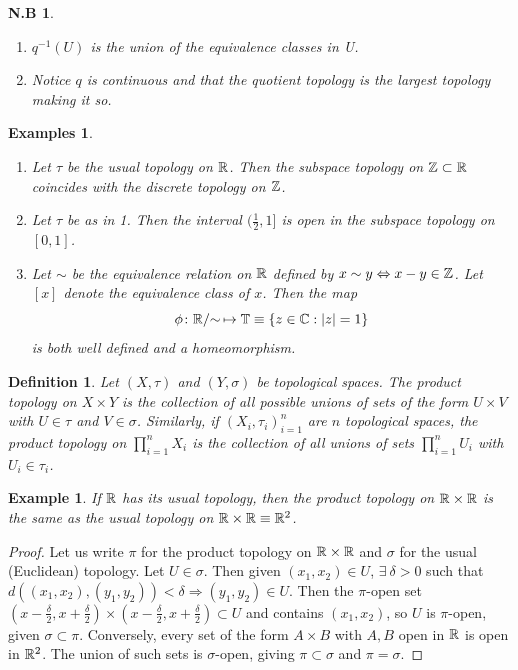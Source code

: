 \documentclass{notes}
\theoremstyle{plain}
\newtheorem{definition}[proposition]{Definition}
\newtheorem*{example}{Example}
\newtheorem*{examples}{Examples}
\newtheorem*{notes}{N.B}
\newcommand{\T}{\mathbb{T}}
\newcommand{\quot}[1]{#1/\negthickspace\sim\,}
\begin{document}
\begin{notes}
\begin{enumerate}
\item $q^{-1}(U)$ is the union of the equivalence classes in U.
\item Notice $q$ is continuous and that the quotient topology is the
largest topology making it so.
\end{enumerate}
\end{notes}

\begin{examples}
\begin{enumerate}
\item Let $\tau$ be the usual topology on $\mathbb{R}$.  Then the subspace topology
on $\mathbb{Z} \subset \mathbb{R}$ coincides with the discrete topology on $\mathbb{Z}$.
\item Let $\tau$ be as in 1.  Then the interval $(\frac{1}{2},1]$ is open
in the subspace topology on $[0,1]$.
\item Let $\sim$ be the equivalence relation on $\mathbb{R}$ defined by $x \sim y
\Leftrightarrow x-y \in \mathbb{Z}$.  Let $[x]$ denote the equivalence class
of $x$.  Then the map \[
\phi \colon \quot{\R} \mapsto \T \equiv \{ z \in \C : 
\abs{z}=1 \}
\] is both well defined and a homeomorphism.
\end{enumerate}
\end{examples}

\begin{definition}
Let $(X,\tau)$ and $(Y,\sigma)$ be topological spaces. The product topology%
on $X \times Y$ is the collection of all possible unions of sets of the form
$U \times V$ with $U \in \tau$ and $V \in \sigma$.  Similarly, if 
$(X_i,\tau_i)_{i=1}^{n}$ are $n$ topological spaces, the product topology 
on $\prod_{i=1}^n X_i$ is the collection of all unions of sets 
$\prod_{i=1}^n U_i$ with $U_i \in \tau_i$.
\end{definition}

\begin{example}
If $\mathbb{R}$ has its usual topology, then the product topology on $\mathbb{R} \times \mathbb{R}$
is the same as the usual topology on $\mathbb{R} \times \mathbb{R} \equiv \mathbb{R}^2$.
\end{example}

\begin{proof}
Let us write $\pi$ for the product topology on $\mathbb{R} \times \mathbb{R}$ and $\sigma$ for
the usual (Euclidean) topology.  Let $U \in \sigma$.  Then given $(x_1,x_2) \in
U$, $\exists\ \delta > 0$ such that $d((x_1,x_2),(y_1,y_2))<\delta
\Rightarrow (y_1,y_2) \in U$.  Then the $\pi$-open set
$(x-\frac{\delta}{2},x+\frac{\delta}{2}) \times 
(x-\frac{\delta}{2},x+\frac{\delta}{2}) \subset U$ and contains $(x_1,x_2)$,
so $U$ is $\pi$-open, given $\sigma \subset \pi$.  Conversely, every set of
the form $A \times B$ with $A,B$ open in $\mathbb{R}$ is open in $\mathbb{R}^2$.  The union
of such sets is $\sigma$-open, giving $\pi \subset \sigma$ and $\pi = \sigma$.
\end{proof}
\end{document}
